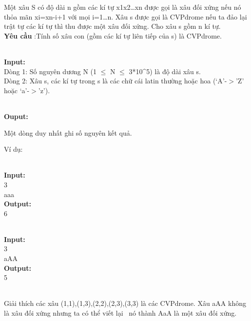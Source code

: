 



   Một xâu S có độ dài n gồm các kí tự x1x2…xn được gọi là xâu đối xứng nếu nó thỏa mãn xi=xn-i+1 với mọi i=1…n. Xâu s được gọi là CVPdrome nếu ta đảo lại trật tự các kí tự thì thu được một xâu đối xứng. Cho xâu s gồm n kí tự.   
\\\textbf{    Yêu cầu   }   :Tính số xâu con (gồm các kí tự liên tiếp của s) là CVPdrome.  


\\\textbf{    Input:   }
\\   Dòng 1: Số nguyên dương N (1 $\le$ N $\le$ 3*10\textasciicircum5) là độ dài xâu s.   
\\   Dòng 2: Xâu s, các kí tự trong s là các chữ cái latin thường hoặc hoa (‘A’-$>$’Z’ hoặc ‘a’-$>$’z’).  


\\\textbf{    Ouput:   }

   Một dòng duy nhất ghi số nguyên kết quả.  

   Ví dụ:  


\\\textbf{    Input:   }
\\   3   
\\   aaa   
\\\textbf{    Output:   }
\\   6  


\\\textbf{    Input:   }
\\   3   
\\   aAA   
\\\textbf{    Output:   }
\\   5  


\\   Giải thích các xâu (1,1),(1,3),(2,2),(2,3),(3,3) là các CVPdrome. Xâu aAA không là xâu đối xứng nhưng ta có thể viết lại  nó thành AaA là một xâu đối xứng.  
